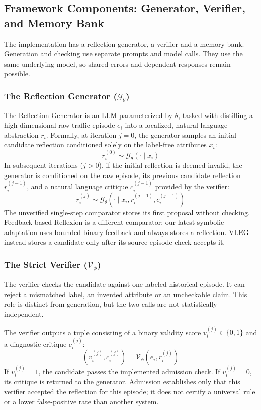 \documentclass[journal]{IEEEtran}
\theoremstyle{definition}
\theoremstyle{remark}
\begin{document}
\subsection{Framework Components: Generator, Verifier, and Memory Bank}
The implementation has a reflection generator, a verifier and a memory bank. Generation and checking use separate prompts and model calls. They use the same underlying model, so shared errors and dependent responses remain possible.

\subsubsection{The Reflection Generator (\texorpdfstring{$\mathcal{G}_\theta$}{G\_theta})}
The Reflection Generator is an LLM parameterized by $\theta$, tasked with distilling a high-dimensional raw traffic episode $e_i$ into a localized, natural language abstraction $r_i$. Formally, at iteration $j=0$, the generator samples an initial candidate reflection conditioned solely on the label-free attributes $x_i$:
\begin{equation}
    r_i^{(0)} \sim \mathcal{G}_\theta(\cdot \mid x_i)
\end{equation}
In subsequent iterations ($j > 0$), if the initial reflection is deemed invalid, the generator is conditioned on the raw episode, its previous candidate reflection $r_i^{(j-1)}$, and a natural language critique $c_i^{(j-1)}$ provided by the verifier:
\begin{equation}
    r_i^{(j)} \sim \mathcal{G}_\theta(\cdot \mid x_i, r_i^{(j-1)}, c_i^{(j-1)})
\end{equation}
The unverified single-step comparator stores its first proposal without checking. Feedback-based Reflexion \cite{shinn2023reflexion} is a different comparator: our latest symbolic adaptation uses bounded binary feedback and always stores a reflection. VLEG instead stores a candidate only after its source-episode check accepts it.

\subsubsection{The Strict Verifier (\texorpdfstring{$\mathcal{V}_\phi$}{V\_phi})}
The verifier checks the candidate against one labeled historical episode. It can reject a mismatched label, an invented attribute or an uncheckable claim. This role is distinct from generation, but the two calls are not statistically independent.

The verifier outputs a tuple consisting of a binary validity score $v_i^{(j)} \in \{0, 1\}$ and a diagnostic critique $c_i^{(j)}$:
\begin{equation}
    (v_i^{(j)}, c_i^{(j)}) = \mathcal{V}_\phi(e_i, r_i^{(j)})
\end{equation}
If $v_i^{(j)}=1$, the candidate passes the implemented admission check. If $v_i^{(j)}=0$, its critique is returned to the generator. Admission establishes only that this verifier accepted the reflection for this episode; it does not certify a universal rule or a lower false-positive rate than another system.
\end{document}
